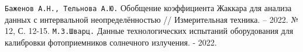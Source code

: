 \begin{thebibliography}{}
	  \texttt{Баженов А.Н., Тельнова А.Ю.} Обобщение коэффициента Жаккара для анализа данных с интервальной неопределённостью // Измерительная техника. – 2022. № 12, С. 12-15.
	  \texttt{М.З.Шварц.} Данные технологических испытаний оборудования для калибровки фотоприемников солнечного излучения. - 2022.
\end{thebibliography}
